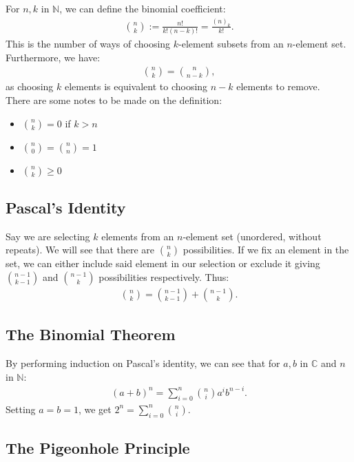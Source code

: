\documentclass[a4paper, 12pt, twoside]{article}
\begin{document}
For $n, k$ in $\mathbb{N}$, we can define the binomial coefficient:  \begin{align*}
 {n \choose k} := \frac{n!}{k!(n-k)!} = \frac{(n)_k}{k!}.
\end{align*}
This is the number of ways of choosing $k$-element subsets
from an $n$-element set. Furthermore, we have: \begin{gather*}
  {n \choose k} = {n \choose n - k},
\end{gather*} as choosing $k$ elements is equivalent to choosing
$n - k$ elements to remove.
\\[\baselineskip]
There are some notes to be made on the definition: \begin{itemize}
  \item ${n \choose k} = 0$ if $k > n$
  \item ${n \choose 0} = {n \choose n} = 1$
  \item ${n \choose k} \geq 0$
\end{itemize}

\subsection{Pascal's Identity}

Say we are selecting $k$ elements from an $n$-element set (unordered, 
without repeats). We will see that there are ${n \choose k}$ possibilities.
If we fix an element in the set, we can either include said element in
our selection or exclude it giving ${n - 1 \choose k - 1}$ and 
${n - 1 \choose k}$ possibilities respectively. Thus: \begin{gather*}
  {n \choose k} = {n - 1 \choose k - 1} + {n - 1 \choose k}.
\end{gather*}

\subsection{The Binomial Theorem}

By performing induction on Pascal's identity, we can see that for 
$a, b$ in $\mathbb{C}$ and $n$ in $\mathbb{N}$: \begin{gather*}
  (a + b)^n = \sum_{i = 0}^n {n \choose i}a^ib^{n - i}.
\end{gather*} Setting $a = b = 1$, we get $2^n = \sum_{i = 0}^n 
{n \choose i}$.

\subsection{The Pigeonhole Principle}
\end{document}
